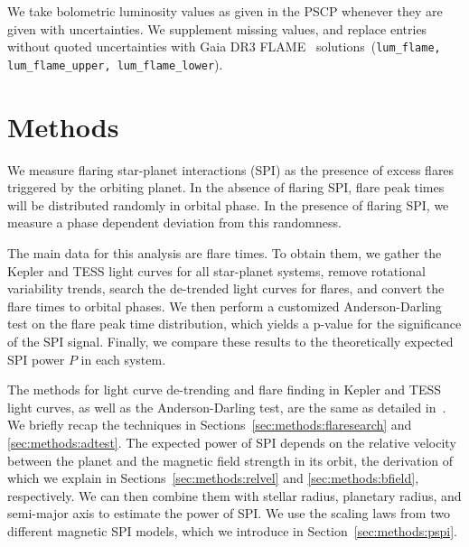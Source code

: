 \documentclass[twocolumn]{aastex631}
\begin{document}
We take bolometric luminosity values as given in the PSCP whenever they are given with uncertainties. We supplement missing values, and replace entries without quoted uncertainties with Gaia DR3 FLAME~\citep{fouesneau2022gaia} solutions~(\texttt{lum\_flame, lum\_flame\_upper, lum\_flame\_lower}). 

\section{Methods}
\label{sec:methods}
We measure flaring star-planet interactions (SPI) as the presence of excess flares triggered by the orbiting planet. In the absence of flaring SPI, flare peak times will be distributed randomly in orbital phase. In the presence of flaring SPI, we measure a phase dependent deviation from this randomness.

The main data for this analysis are flare times. To obtain them, we gather the Kepler and TESS light curves for all star-planet systems, remove rotational variability trends, search the de-trended light curves for flares, and convert the flare times to orbital phases. We then perform a customized Anderson-Darling test on the flare peak time distribution, which yields a p-value for the significance of the SPI signal. Finally, we compare these results to the theoretically expected SPI power $P$ in each system.

The methods for light curve de-trending and flare finding in Kepler and TESS light curves, as well as the Anderson-Darling test, are the same as detailed in~\citet{ilin2022searching}. We briefly recap the techniques in Sections~\ref{sec:methods:flaresearch} and \ref{sec:methods:adtest}. The expected power of SPI depends on the relative velocity between the planet and the magnetic field strength in its orbit, the derivation of which we explain in 
Sections~\ref{sec:methods:relvel} and \ref{sec:methods:bfield}, respectively. We can then combine them with stellar radius, planetary radius, and semi-major axis to estimate the power of SPI. We use the scaling laws from two different magnetic SPI models, which we introduce in Section~\ref{sec:methods:pspi}.
\end{document}
